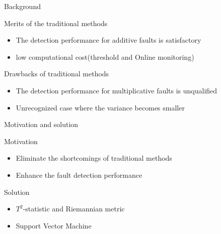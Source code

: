 \documentclass[10pt]{beamer}
\begin{document}
\begin{frame}{Background}
 \begin{exampleblock}{Merits of the traditional methods}
	\begin{itemize}
    \item The detection performance for additive faults is satisfactory
    \item low computational cost(threshold and Online monitoring)
    \end{itemize}
    \end{exampleblock}
    \begin{exampleblock}{Drawbacks of traditional methods}
      \begin{itemize}
      \item The detection performance for multiplicative faults is unqualified
      \item Unrecognized case where the variance becomes smaller
 	 \end{itemize}  
 	 \end{exampleblock}
\end{frame}

\begin{frame}{Motivation and solution}
\begin{exampleblock}{Motivation}
      \begin{itemize}
      \item Eliminate the shortcomings of traditional methods
      \item Enhance the fault detection performance
 	 \end{itemize}  
 	 \end{exampleblock}
 \begin{exampleblock}{Solution}
      \begin{itemize}
      \item $T^2$-statistic and Riemannian metric
      \item Support Vector Machine
 	 \end{itemize}  
 	 \end{exampleblock}
\end{frame}
\end{document}
